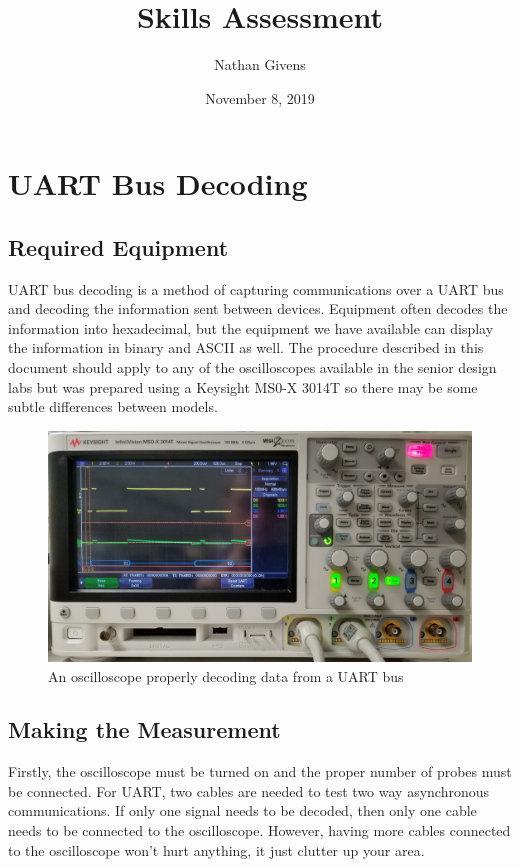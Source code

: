 \documentclass{article}
\title{Skills Assessment}
\author{Nathan Givens}
\date{November 8, 2019}
\begin{document}
  \maketitle

  \section{UART Bus Decoding}

  \subsection{Required Equipment}

  UART bus decoding is a method of capturing communications over a UART bus and
  decoding the information sent between devices. Equipment often decodes the
  information into hexadecimal, but the equipment we have available can display
  the information in binary and ASCII as well. The procedure described in this
  document should apply to any of the oscilloscopes available in the senior
  design labs but was prepared using a Keysight MS0-X 3014T so there may be
  some subtle differences between models.

  \begin{figure}[h]
    \includegraphics[width=\textwidth]{images/uart/full_scope.jpg}
    \caption{An oscilloscope properly decoding data from a UART bus}
  \end{figure}

  \subsection{Making the Measurement}

  Firstly, the oscilloscope must be turned on and the proper number of probes
  must be connected. For UART, two cables are needed to test two way
  asynchronous communications. If only one signal needs to be decoded, then only
  one cable needs to be connected to the oscilloscope. However, having more
  cables connected to the oscilloscope won't hurt anything, it just clutter up
  your area.
\end{document}
